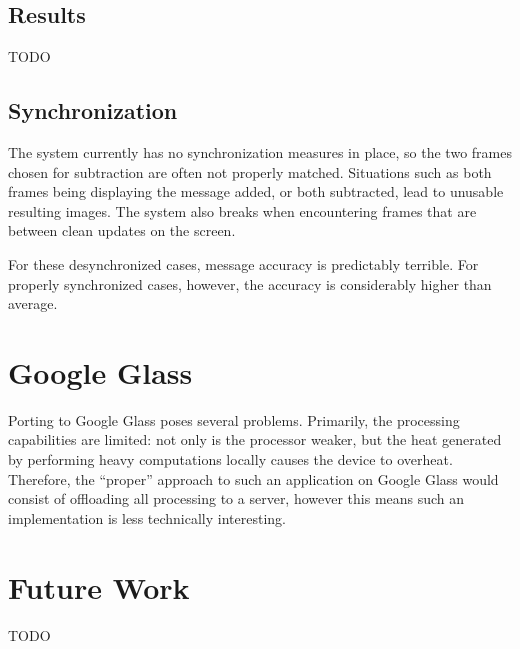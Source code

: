 \documentclass[11pt, letterpaper]{article}
\begin{document}
\subsection{Results}
TODO

\subsection{Synchronization}
The system currently has no synchronization measures in place, so the two frames chosen for subtraction are often not properly matched.
Situations such as both frames being displaying the message added, or both subtracted, lead to unusable resulting images.
The system also breaks when encountering frames that are between clean updates on the screen.

For these desynchronized cases, message accuracy is predictably terrible.
For properly synchronized cases, however, the accuracy is considerably higher than average.

\section{Google Glass}
Porting to Google Glass poses several problems. Primarily, the processing capabilities are limited: not only is the processor weaker, but the heat generated by performing heavy computations locally causes the device to overheat.
Therefore, the ``proper'' approach to such an application on Google Glass would consist of offloading all processing to a server, however this means such an implementation is less technically interesting.

\section{Future Work}
TODO

\printbibliography
\end{document}
